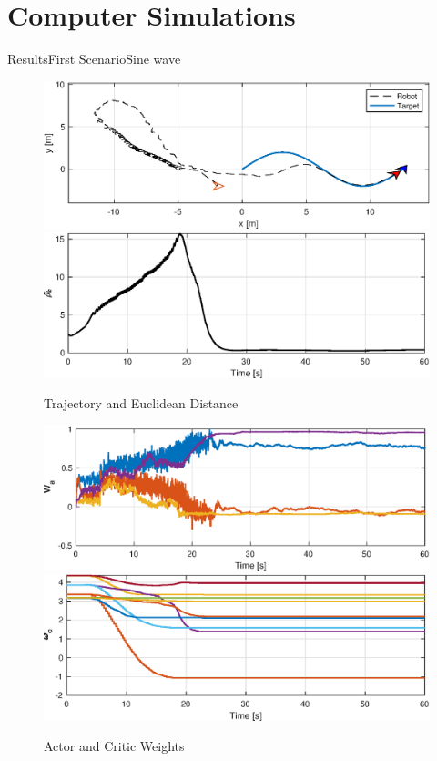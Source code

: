 \documentclass{beamer}
\begin{document}
\section{Computer Simulations}
\begin{frame}{Results}{First Scenario}{Sine wave}
\begin{figure} 
{\includegraphics[scale=0.3]{figs/matlab/Sinewave/trajectorySineWave.eps}}
{\includegraphics[scale=0.3]{figs/matlab/Sinewave/euclideanDistanceSineWave.eps}}
\caption{Trajectory and Euclidean Distance}
\end{figure}
\begin{figure}
{\includegraphics[scale=0.3]{figs/matlab/Sinewave/weightActorSineWave.eps}}
{\includegraphics[scale=0.3]{figs/matlab/Sinewave/weightSineWave.eps}}
\caption{Actor and Critic Weights}
\end{figure}
\end{frame}
\end{document}
